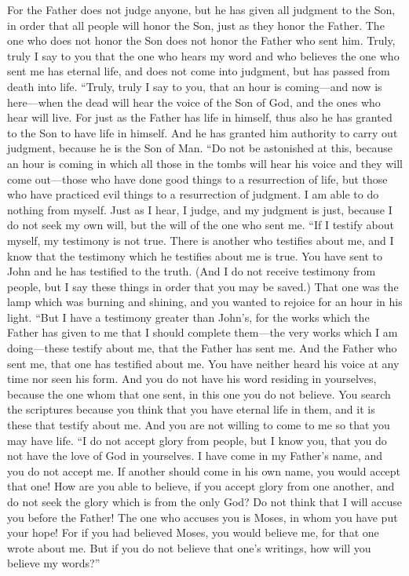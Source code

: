 \begin{biblechapter}
\verse For the Father does not judge anyone, but he has given all judgment to the Son,
\verse in order that all people will honor the Son, just as they honor the Father. The one who does not honor the Son does not honor the Father who sent him.
\verse Truly, truly I say to you that the one who hears my word and who believes the one who sent me has eternal life, and does not come into judgment, but has passed from death into life.
\verse “Truly, truly I say to you, that an hour is coming—and now is here—when the dead will hear the voice of the Son of God, and the ones who hear will live.
\verse For just as the Father has life in himself, thus also he has granted to the Son to have life in himself.
\verse And he has granted him authority to carry out judgment, because he is the Son of Man.
\verse “Do not be astonished at this, because an hour is coming in which all those in the tombs will hear his voice
\verse and they will come out—those who have done good things to a resurrection of life, but those who have practiced evil things to a resurrection of judgment.
\verse I am able to do nothing from myself. Just as I hear, I judge, and my judgment is just, because I do not seek my own will, but the will of the one who sent me.
 “If I testify about myself, my testimony is not true.
\verse There is another who testifies about me, and I know that the testimony which he testifies about me is true.
\verse You have sent to John and he has testified to the truth.
\verse (And I do not receive testimony from people, but I say these things in order that you may be saved.)
\verse That one was the lamp which was burning and shining, and you wanted to rejoice for an hour in his light.
\verse “But I have a testimony greater than John’s, for the works which the Father has given to me that I should complete them—the very works which I am doing—these testify about me, that the Father has sent me.
\verse And the Father who sent me, that one has testified about me. You have neither heard his voice at any time nor seen his form.
\verse And you do not have his word residing in yourselves, because the one whom that one sent, in this one you do not believe.
\verse You search the scriptures because you think that you have eternal life in them, and it is these that testify about me.
\verse And you are not willing to come to me so that you may have life.
\verse “I do not accept glory from people,
\verse but I know you, that you do not have the love of God in yourselves.
\verse I have come in my Father’s name, and you do not accept me. If another should come in his own name, you would accept that one!
\verse How are you able to believe, if you accept glory from one another, and do not seek the glory which is from the only God?
\verse Do not think that I will accuse you before the Father! The one who accuses you is Moses, in whom you have put your hope!
\verse For if you had believed Moses, you would believe me, for that one wrote about me.
\verse But if you do not believe that one’s writings, how will you believe my words?”
\end{biblechapter}

